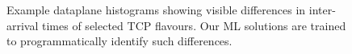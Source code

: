 \begin{figure}[t]
    \vspace{-0.5cm}
    \centering
    \begin{subfigure}[t]{0.49\linewidth}
        \centering
        \label{fig:cubic-hist-app}
    \end{subfigure}
    \begin{subfigure}[t]{0.49\linewidth}
        \centering
        \label{fig:bbr-hist-app}
    \end{subfigure}
    \caption{Example dataplane histograms showing visible differences in inter-arrival times of selected TCP flavours. Our ML solutions are trained to programmatically identify such differences.}
    \label{fig:tcp-hist-app}
    \vspace{-0.6cm}
\end{figure}


